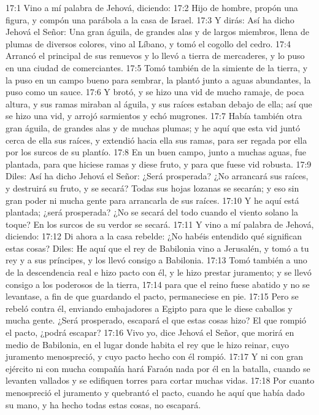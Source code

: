 17:1 Vino a mí palabra de Jehová, diciendo:   
17:2 Hijo de hombre, propón una figura, y compón una parábola a la casa de Israel.   
17:3 Y dirás: Así ha dicho Jehová el Señor: Una gran águila, de grandes alas y de largos miembros, llena de plumas de diversos colores, vino al Líbano, y tomó el cogollo del cedro.   
17:4 Arrancó el principal de sus renuevos y lo llevó a tierra de mercaderes, y lo puso en una ciudad de comerciantes.   
17:5 Tomó también de la simiente de la tierra, y la puso en un campo bueno para sembrar, la plantó junto a aguas abundantes, la puso como un sauce.   
17:6 Y brotó, y se hizo una vid de mucho ramaje, de poca altura, y sus ramas miraban al águila, y sus raíces estaban debajo de ella; así que se hizo una vid, y arrojó sarmientos y echó mugrones.   
17:7 Había también otra gran águila, de grandes alas y de muchas plumas; y he aquí que esta vid juntó cerca de ella sus raíces, y extendió hacia ella sus ramas, para ser regada por ella por los surcos de su plantío.   
17:8 En un buen campo, junto a muchas aguas, fue plantada, para que hiciese ramas y diese fruto, y para que fuese vid robusta.   
17:9 Diles: Así ha dicho Jehová el Señor: ¿Será prosperada? ¿No arrancará sus raíces, y destruirá su fruto, y se secará? Todas sus hojas lozanas se secarán; y eso sin gran poder ni mucha gente para arrancarla de sus raíces.   
17:10 Y he aquí está plantada; ¿será prosperada? ¿No se secará del todo cuando el viento solano la toque? En los surcos de su verdor se secará.   
17:11 Y vino a mí palabra de Jehová, diciendo:   
17:12 Di ahora a la casa rebelde: ¿No habéis entendido qué significan estas cosas? Diles: He aquí que el rey de Babilonia vino a Jerusalén, y tomó a tu rey y a sus príncipes, y los llevó consigo a Babilonia.   
17:13 Tomó también a uno de la descendencia real e hizo pacto con él, y le hizo prestar juramento; y se llevó consigo a los poderosos de la tierra, 
17:14 para que el reino fuese abatido y no se levantase, a fin de que guardando el pacto, permaneciese en pie.   
17:15 Pero se rebeló contra él,  enviando embajadores a Egipto para que le diese caballos y mucha gente. ¿Será prosperado, escapará el que estas cosas hizo? El que rompió el pacto, ¿podrá escapar?   
17:16 Vivo yo, dice Jehová el Señor, que morirá en medio de Babilonia, en el lugar donde habita el rey que le hizo reinar, cuyo juramento menospreció, y cuyo pacto hecho con él rompió.   
17:17 Y ni con gran ejército ni con mucha compañía hará Faraón nada por él en la batalla, cuando se levanten vallados y se edifiquen torres para cortar muchas vidas.   
17:18 Por cuanto menospreció el juramento y quebrantó el pacto, cuando he aquí que había dado su mano, y ha hecho todas estas cosas, no escapará.   
